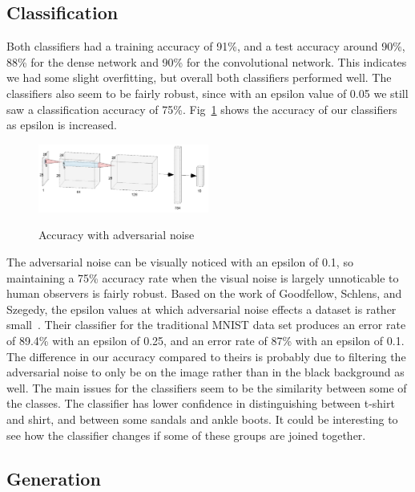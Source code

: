 \documentclass[conference]{IEEEtran}
\begin{document}
    \subsection{Classification}\label{subsec:results-classification}
    
    Both classifiers had a training accuracy of 91\%, and a test accuracy around 90\%, 88\% for the dense network and 90\% for the convolutional network. This indicates we had some slight overfitting, but overall both classifiers performed well. The classifiers also seem to be fairly robust, since with an epsilon value of 0.05 we still saw a classification accuracy of 75\%. Fig~\ref{AdvPlot} shows the accuracy of our classifiers as epsilon is increased.
    \begin{figure}[!h]
    \begin{center}
    \caption{Accuracy with adversarial noise}
    \includegraphics[width=0.5\textwidth]{Second_Classifier_Architecture.png}
    \label{AdvPlot}
    \end{center}
    \end{figure}
The adversarial noise can be visually noticed with an epsilon of 0.1, so maintaining a 75\% accuracy rate when the visual noise is largely unnoticable to human observers is fairly robust. Based on the work of Goodfellow, Schlens, and Szegedy, the epsilon values at which adversarial noise effects a dataset is rather small~\cite{adversarialexamples}. Their classifier for the traditional MNIST data set produces an error rate of 89.4\% with an epsilon of 0.25, and an error rate of 87\% with an epsilon of 0.1. The difference in our accuracy compared to theirs is probably due to filtering the adversarial noise to only be on the image rather than in the black background as well. The main issues for the classifiers seem to be the similarity between some of the classes. The classifier has lower confidence in distinguishing between t-shirt and shirt, and between some sandals and ankle boots. It could be interesting to see how the classifier changes if some of these groups are joined together.

    \subsection{Generation}\label{subsec:results-generation}
\end{document}
